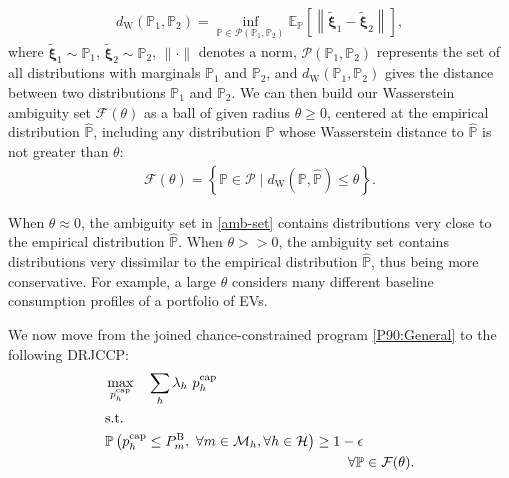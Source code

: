 \documentclass[conference]{IEEEtran}
\begin{document}
\begin{align}\label{was}
    d_{\mathrm{W}}\left(\mathbb{P}_1, \mathbb{P}_2\right)=\inf _{\mathbb{P} \in \mathcal{P}\left(\mathbb{P}_1, \mathbb{P}_2\right)} \mathbb{E}_{\mathbb{P}}\left[\left\|\tilde{\boldsymbol{\xi}}_1-\tilde{\boldsymbol{\xi}}_2\right\|\right],
\end{align}
where $\tilde{\boldsymbol{\xi}}_1 \sim \mathbb{P}_1$, $\tilde{\boldsymbol{\xi}}_2 \sim \mathbb{P}_2$, $\|\cdot\|$ denotes a norm, $\mathcal{P}\left(\mathbb{P}_1, \mathbb{P}_2\right)$ represents  the set of all distributions with marginals $\mathbb{P}_1$ and $\mathbb{P}_2$, and 
 $d_{\mathrm{W}}\left(\mathbb{P}_1, \mathbb{P}_2\right)$ gives the distance between two distributions $\mathbb{P}_1$ and $\mathbb{P}_2$.
We can then build our Wasserstein ambiguity set   $\mathcal{F}(\theta)$ as a ball of given radius $\theta \geq 0$, centered at the empirical distribution $\hat{\mathbb{P}}$, including any distribution $\mathbb{P}$ whose Wasserstein distance to $\hat{\mathbb{P}}$ is not greater than $\theta$:
%
\begin{align}\label{amb-set}
    \mathcal{F}(\theta)=\left\{\mathbb{P} \in \mathcal{P} \mid d_{\mathrm{W}}(\mathbb{P}, \hat{\mathbb{P}}) \leq \theta\right\}.
\end{align}

When $\theta \approx 0$, the ambiguity set in \eqref{amb-set} contains distributions very close to the empirical distribution $\hat{\mathbb{P}}$. When $\theta\!>>\!0$, the ambiguity set contains distributions very dissimilar to the empirical distribution $\hat{\mathbb{P}}$, thus being more conservative. For example, a large $\theta$ considers many different baseline consumption profiles of a portfolio of \acp{EV}.

We now move from the joined chance-constrained program \eqref{P90:General} to the following \ac{DRJCCP}: 
%
\begin{subequations}\label{P90:General:DRJCC}
    \begin{align}
       & \max_{p_{h}^{\text{cap}}} \quad  \sum_h \lambda_h \ p_{h}^{\text{cap}}                                                                                                                                                                                                     \\
            &\text{s.t.} \nonumber  \\
    &           \mathbb{P}  \left( p_{h}^{\text{cap}} \leq P_{m}^{\text{B}}, \ \forall{m} \in \mathcal{M}_{h},  \forall{h} \in \mathcal{H}  \right) 
         \geq 1 - \epsilon \notag\\
        & \hspace{6.1cm} \forall{\mathbb{P}} \in \mathcal{F}(\theta). \label{P90:General:drjcc_c}
    \end{align}
\end{subequations}
\end{document}
